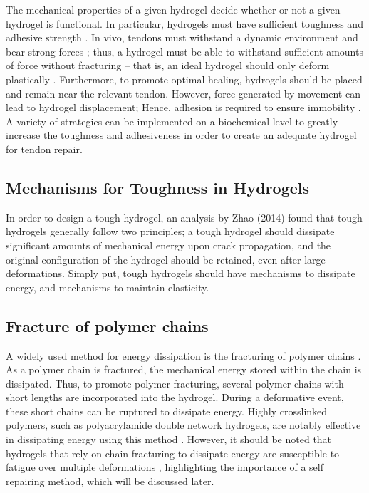 The mechanical properties of a given hydrogel decide whether or not a given hydrogel is functional. In particular, hydrogels must have sufficient toughness and adhesive strength \autocite{freedmanEnhancedTendonHealing2022}. In vivo, tendons must withstand a dynamic environment and bear strong forces \autocite{ChenAdvancesApplicationHydrogel}; thus, a hydrogel must be able to withstand sufficient amounts of force without fracturing – that is, an ideal hydrogel should only deform plastically \autocite{freedmanEnhancedTendonHealing2022}. Furthermore, to promote optimal healing, hydrogels should be placed and remain near the relevant tendon. However, force generated by movement can lead to hydrogel displacement; Hence, adhesion is required to ensure immobility \autocite{freedmanEnhancedTendonHealing2022}. A variety of strategies can be implemented on a biochemical level to greatly increase the toughness and adhesiveness in order to create an adequate hydrogel for tendon repair.

\subsection{Mechanisms for Toughness in Hydrogels}
In order to design a tough hydrogel, an analysis by Zhao (2014) found that tough hydrogels generally follow two principles; a tough hydrogel should dissipate significant amounts of mechanical energy upon crack propagation, and the original configuration of the hydrogel should be retained, even after large deformations. Simply put, tough hydrogels should have mechanisms to dissipate energy, and mechanisms to maintain elasticity. 

\subsection{Fracture of polymer chains}
A widely used method for energy dissipation is the fracturing of polymer chains \autocite{zhao_multi-scale_2014}. As a polymer chain is fractured, the mechanical energy stored within the chain is dissipated. Thus, to promote polymer fracturing, several polymer chains with short lengths are incorporated into the hydrogel. During a deformative event, these short chains can be ruptured to dissipate energy. Highly crosslinked polymers, such as polyacrylamide double network hydrogels, are notably effective in dissipating energy using this method \autocite{zhao_multi-scale_2014}. However, it should be noted that hydrogels that rely on chain-fracturing to dissipate energy are susceptible to fatigue over multiple deformations \autocite{zhao_multi-scale_2014}, highlighting the importance of a self repairing method, which will be discussed later.

